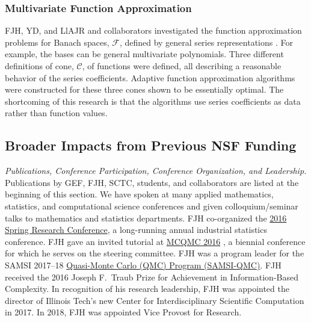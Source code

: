 \documentclass[11pt]{NSFamsart}
\newcommand{\calc}{{\mathcal{C}}}
\newcommand{\calf}{{\mathcal{F}}}
\begin{document}
\subsubsection{Multivariate Function Approximation} \label{sec:PrevFunAppx}

FJH, YD, and LlAJR and collaborators investigated the function approximation problems for Banach spaces, $\calf$, defined by general series representations \cite{DinHic20a,DinEtal20a}.  For example, the bases can be general multivariate polynomials.  Three different definitions of cone, $\calc$, of functions were defined, all describing a reasonable behavior of the series coefficients.  Adaptive function approximation algorithms were constructed for these three cones shown to be essentially optimal.  The shortcoming of this research is that the algorithms use series coefficients as data rather than function values. 


\subsection{Broader Impacts from Previous NSF Funding} \label{prevBIsect}

\emph{Publications, Conference Participation, Conference Organization, and Leadership.} Publications by GEF, FJH,  SCTC, students, and collaborators are listed at the beginning of this section.  We have spoken at many applied mathematics, statistics, 
and computational science conferences and given colloquium/seminar talks to mathematics and 
statistics departments.  FJH co-organized the 
\href{http://cos.iit.edu/2016-spring-research-conference/}{2016 Spring Research 
Conference}, a long-running annual industrial statistics conference.   FJH gave an invited tutorial
at \href{http://mcqmc2016.stanford.edu}{MCQMC 2016} 
\cite{Hic17a}, a biennial conference for which he serves on the steering committee.  FJH 
was a program leader for the SAMSI 2017--18 
\href{https://www.samsi.info/programs-and-activities/year-long-research-programs/2017-18-program-quasi-monte-carlo-high-dimensional-sampling-methods-applied-mathematics-qmc/
}{Quasi-Monte Carlo (QMC) Program (\hypertarget{SAMSIlink}{SAMSI-QMC})}.   FJH received the 2016 Joseph F.\ Traub Prize for Achievement in Information-Based Complexity. In recognition of his research leadership, FJH was appointed the director of Illinois Tech's new Center for Interdisciplinary 
Scientific Computation in 2017.  In 2018, FJH was appointed Vice Provost for Research.
	
\end{document}
